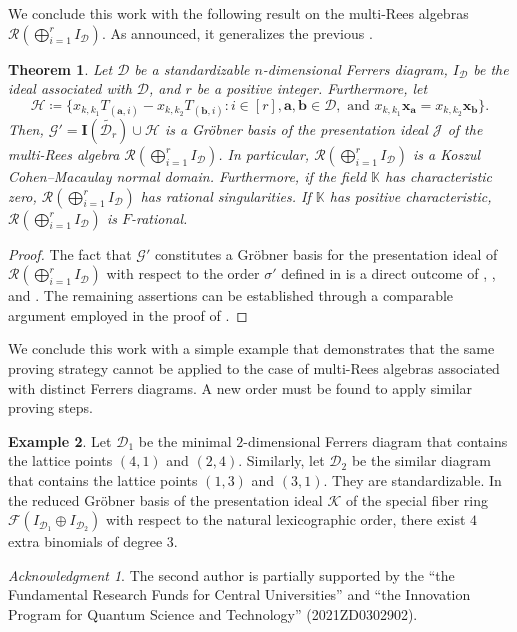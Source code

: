 \documentclass[11pt,a4paper,reqno,dvipsnames]{amsart}
\theoremstyle{plain}
\newtheorem{Theorem}{Theorem}[section]
\theoremstyle{definition}
\newtheorem{Assumptions and Discussion}[Theorem]{Assumptions and Discussion}
\newtheorem{Example}[Theorem]{Example}
\theoremstyle{remark}
\newtheorem*{acknowledgment*}{Acknowledgment}
\def\KK{{\mathbb K}}
\newcommand\bda{{\bm a}}
\newcommand\bdb{{\bm b}}
\newcommand\bdx{{\bm x}}
\newcommand\bfI{\mathbf{I}}
\newcommand\calD{\mathcal{D}}
\newcommand\calF{\mathcal{F}}
\newcommand\calG{\mathcal{G}}
\newcommand\calH{\mathcal{H}}
\newcommand\calJ{\mathcal{J}}
\newcommand\calK{\mathcal{K}}
\newcommand\calR{\mathcal{R}}
\begin{document}
We conclude this work with the following result on the multi-Rees algebras $\calR(\bigoplus_{i=1}^{r} I_{\calD})$. As announced, it generalizes the previous .

\begin{Theorem}
    \label{ReesnD}
    Let $\calD$ be a standardizable $n$-dimensional Ferrers diagram, $I_{\calD}$ be the ideal associated with $\calD$, and $r$ be a positive integer.  Furthermore, let 
    \[
        \calH\coloneqq \{x_{k,k_1}T_{(\bda,i)}-x_{k,k_2}T_{(\bdb,i)}: i\in [r], \bda,\bdb\in \calD, \text{ and } x_{k,k_1}\bdx_{\bda}=x_{k,k_2}\bdx_\bdb \}.
    \]
    Then, $\calG'=\bfI(\widetilde{\calD_r}) \cup \calH$ is a Gr\"{o}bner basis of the presentation ideal $\calJ$ of the multi-Rees algebra $\calR(\bigoplus_{i=1}^{r}I_{ \calD})$.
    In particular, $\calR(\bigoplus_{i=1}^{r} I_{\calD})$ is a Koszul Cohen--Macaulay normal domain.
    Furthermore, if the field $\KK$ has characteristic zero, $\calR(\bigoplus_{i=1}^{r} I_{\calD})$ has rational singularities. If $\KK$ has positive characteristic, $\calR(\bigoplus_{i=1}^{r} I_{\calD})$ is $F$-rational.
\end{Theorem}

\begin{proof}
    The fact that $\mathcal{G}'$ constitutes a Gr\"obner basis for the presentation ideal of $\mathcal{R}(\bigoplus_{i=1}^{r}I_{\mathcal{D}})$ with respect to the order $\sigma'$ defined in  is a direct outcome of , , and . The remaining assertions can be established through a comparable argument employed in the proof of .
\end{proof}





We conclude this work with a simple example that demonstrates that the same proving strategy cannot be applied to the case of multi-Rees algebras associated with distinct Ferrers diagrams. A new order must be found to apply similar proving steps. 

\begin{Example}
    \label{exam:diffD}    
    Let $\calD_1$ be the minimal $2$-dimensional Ferrers diagram that contains the lattice points $(4,1)$ and $(2,4)$. Similarly, let $\calD_2$ be the similar diagram that contains the lattice points  $(1,3)$ and $(3,1)$. They are standardizable.   In the reduced Gr\"obner basis of the presentation ideal $\calK$ of the special fiber ring $\calF(I_{\calD_1} \oplus I_{\calD_2})$ with respect to the natural lexicographic order, there exist $4$ extra binomials of degree $3$.
\end{Example}

\begin{acknowledgment*}
    The second author is partially supported by the ``the Fundamental Research Funds for Central Universities'' and ``the Innovation Program for Quantum Science and Technology'' (2021ZD0302902).
\end{acknowledgment*}


\end{document}
